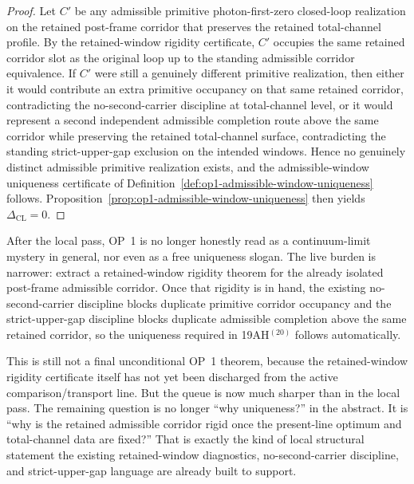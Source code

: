 \begin{proof}
Let \(C'\) be any admissible primitive photon-first-zero closed-loop realization on the retained post-frame corridor that preserves the retained total-channel profile. By the retained-window rigidity certificate, \(C'\) occupies the same retained corridor slot as the original loop up to the standing admissible corridor equivalence. If \(C'\) were still a genuinely different primitive realization, then either it would contribute an extra primitive occupancy on that same retained corridor, contradicting the no-second-carrier discipline at total-channel level, or it would represent a second independent admissible completion route above the same corridor while preserving the retained total-channel surface, contradicting the standing strict-upper-gap exclusion on the intended windows. Hence no genuinely distinct admissible primitive realization exists, and the admissible-window uniqueness certificate of Definition~\ref{def:op1-admissible-window-uniqueness} follows. Proposition~\ref{prop:op1-admissible-window-uniqueness} then yields \(\Delta_{\mathrm{CL}}=0\).
\end{proof}

\begin{corollary}
\label{cor:op1-live-burden-after-r11}
After the local pass, OP~1 is no longer honestly read as a continuum-limit mystery in general, nor even as a free uniqueness slogan. The live burden is narrower: extract a retained-window rigidity theorem for the already isolated post-frame admissible corridor. Once that rigidity is in hand, the existing no-second-carrier discipline blocks duplicate primitive corridor occupancy and the strict-upper-gap discipline blocks duplicate admissible completion above the same retained corridor, so the uniqueness required in 19AH$^{(20)}$ follows automatically.
\end{corollary}

\begin{remark}
This is still not a final unconditional OP~1 theorem, because the retained-window rigidity certificate itself has not yet been discharged from the active comparison/transport line. But the queue is now much sharper than in the local pass. The remaining question is no longer ``why uniqueness?'' in the abstract. It is ``why is the retained admissible corridor rigid once the present-line optimum and total-channel data are fixed?'' That is exactly the kind of local structural statement the existing retained-window diagnostics, no-second-carrier discipline, and strict-upper-gap language are already built to support.
\end{remark}


